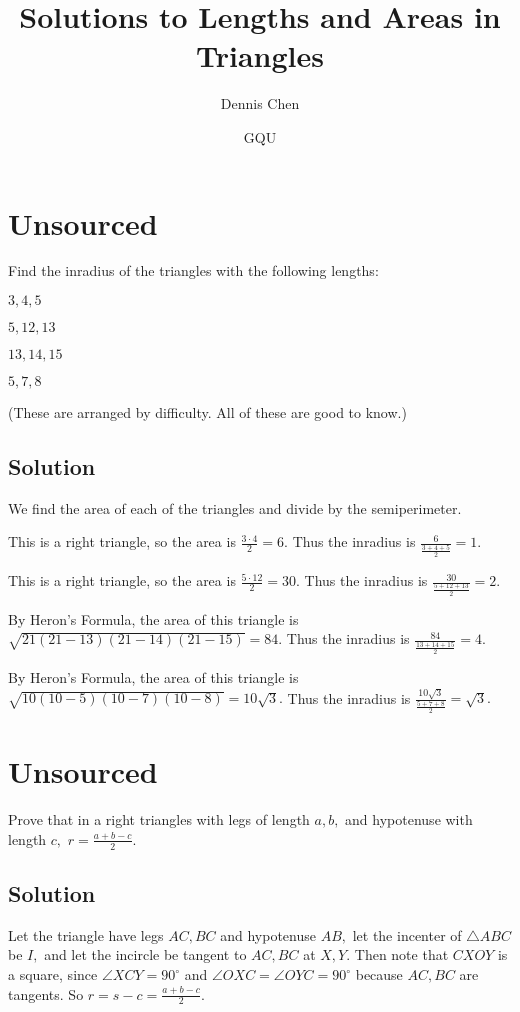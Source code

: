 \documentclass{article}
\title{Solutions to Lengths and Areas in Triangles}
\author{Dennis Chen}
\date{GQU}
\begin{document}
\maketitle

\toc

\pagebreak\section{Unsourced}
Find the inradius of the triangles with the following lengths:
    
    \begin{itemize}
        \Item $3,4,5$
        
        \Item $5,12,13$
        
        \Item $13,14,15$
        
        \Item $5,7,8$
    \end{itemize}

    (These are arranged by difficulty. All of these are good to know.)
    
\subsection{Solution}
We find the area of each of the triangles and divide by the semiperimeter.
\begin{itemize}
\Item This is a right triangle, so the area is $\frac{3\cdot 4}{2}=6.$ Thus the inradius is $\frac{6}{\frac{3+4+5}{2}}=1.$

\Item This is a right triangle, so the area is $\frac{5\cdot 12}{2}=30.$ Thus the inradius is $\frac{30}{\frac{5+12+13}{2}}=2.$

\Item By Heron's Formula, the area of this triangle is $\sqrt{21(21-13)(21-14)(21-15)}=84.$ Thus the inradius is $\frac{84}{\frac{13+14+15}{2}}=4.$

\Item By Heron's Formula, the area of this triangle is $\sqrt{10(10-5)(10-7)(10-8)}=10\sqrt{3}.$ Thus the inradius is $\frac{10\sqrt{3}}{\frac{5+7+8}{2}}=\sqrt{3}.$
\end{itemize}

\pagebreak\section{Unsourced}
Prove that in a right triangles with legs of length $a,b,$ and hypotenuse with length $c,$ $r=\frac{a+b-c}{2}.$

\subsection{Solution}
Let the triangle have legs $AC,BC$ and hypotenuse $AB,$ let the incenter of $\triangle ABC$ be $I,$ and let the incircle be tangent to $AC,BC$ at $X,Y.$ Then note that $CXOY$ is a square, since $\angle XCY=90^{\circ}$ and $\angle OXC=\angle OYC=90^{\circ}$ because $AC,BC$ are tangents. So $r=s-c=\frac{a+b-c}{2}.$
\end{document}
